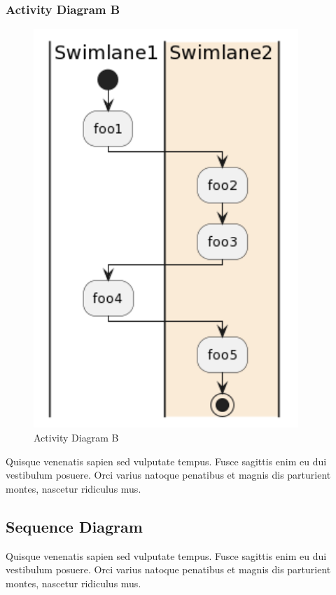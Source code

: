 \subsubsection{Activity Diagram B}
\begin{figure}[H]
    \centering
    \includegraphics[width=10cm]{assets/pics/dummy-activity-diagram.png}
    \caption{Activity Diagram B}
    \label{fig:activityDiagramB}
\end{figure}

Quisque venenatis sapien sed vulputate tempus. Fusce sagittis enim eu dui vestibulum posuere. Orci varius natoque penatibus et magnis dis parturient montes, nascetur ridiculus mus.

\subsection{Sequence Diagram}
Quisque venenatis sapien sed vulputate tempus. Fusce sagittis enim eu dui vestibulum posuere. Orci varius natoque penatibus et magnis dis parturient montes, nascetur ridiculus mus.
